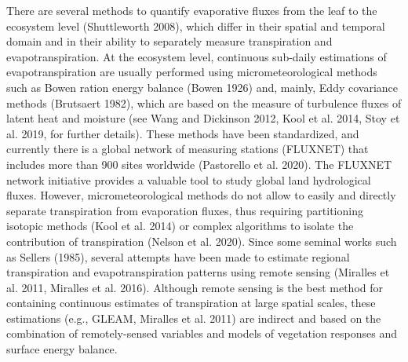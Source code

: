 \documentclass[11pt,twoside]{reedthesis}
\begin{document}
There are several methods to quantify evaporative fluxes from the leaf
to the ecosystem level (Shuttleworth 2008), which differ in their
spatial and temporal domain and in their ability to separately measure
transpiration and evapotranspiration. At the ecosystem level, continuous
sub-daily estimations of evapotranspiration are usually performed using
micrometeorological methods such as Bowen ration energy balance (Bowen
1926) and, mainly, Eddy covariance methods (Brutsaert 1982), which are
based on the measure of turbulence fluxes of latent heat and moisture
(see Wang and Dickinson 2012, Kool et al. 2014, Stoy et al. 2019, for
further details). These methods have been standardized, and currently
there is a global network of measuring stations (FLUXNET) that includes
more than 900 sites worldwide (Pastorello et al. 2020). The FLUXNET
network initiative provides a valuable tool to study global land
hydrological fluxes. However, micrometeorological methods do not allow
to easily and directly separate transpiration from evaporation fluxes,
thus requiring partitioning isotopic methods (Kool et al. 2014) or
complex algorithms to isolate the contribution of transpiration (Nelson
et al. 2020). Since some seminal works such as Sellers (1985), several
attempts have been made to estimate regional transpiration and
evapotranspiration patterns using remote sensing (Miralles et al. 2011,
Miralles et al. 2016). Although remote sensing is the best method for
containing continuous estimates of transpiration at large spatial
scales, these estimations (e.g., GLEAM, Miralles et al. 2011) are
indirect and based on the combination of remotely-sensed variables and
models of vegetation responses and surface energy balance.\par
\end{document}
